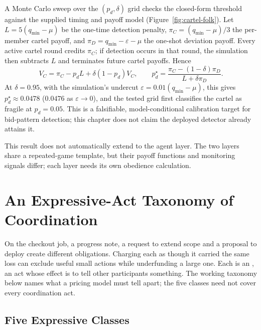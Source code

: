 \documentclass[11pt,a4paper]{article}
\theoremstyle{definition}
\theoremstyle{remark}
\begin{document}
A Monte Carlo sweep over the $(p_d, \delta)$ grid checks the closed-form threshold against the supplied timing and payoff model (Figure~\ref{fig:cartel-folk}). Let $L=5(q_{\min}-\mu)$ be the one-time detection penalty, $\pi_C=(q_{\min}-\mu)/3$ the per-member cartel payoff, and $\pi_D=q_{\min}-\varepsilon-\mu$ the one-shot deviation payoff. Every active cartel round credits $\pi_C$; if detection occurs in that round, the simulation then subtracts $L$ and terminates future cartel payoffs. Hence
\[
V_C=\pi_C-p_dL+\delta(1-p_d)V_C,
\qquad
p_d^\star=\frac{\pi_C-(1-\delta)\pi_D}{L+\delta\pi_D}.
\]
At $\delta=0.95$, with the simulation's undercut $\varepsilon=0.01(q_{\min}-\mu)$, this gives $p_d^\star\approx0.0478$ ($0.0476$ as $\varepsilon\to0$), and the tested grid first classifies the cartel as fragile at $p_d=0.05$. This is a falsifiable, model-conditional calibration target for bid-pattern detection; this chapter does not claim the deployed detector already attains it.



This result does not automatically extend to the agent layer. The two layers share a repeated-game template, but their payoff functions and monitoring signals differ; each layer needs its own obedience calculation.

\pdexercisepointer{\ref{ex:bonded-a5-coverage-bound}}{\ref{ex:bonded-insurance-alt-pricing}}{\pageref{ex:bonded-a5-coverage-bound}}

\section{An Expressive-Act Taxonomy of Coordination}\label{sec:taxonomy}

On the checkout job, a progress note, a request to extend scope and a proposal
to deploy create different obligations. Charging each as though it carried the
same loss can exclude useful small actions while underfunding a large one.
Each is an , an act whose effect is to tell other
participants something. The working taxonomy below names what a pricing model
must tell apart; the five classes need not cover every coordination act.

\subsection{Five Expressive Classes}
\end{document}
